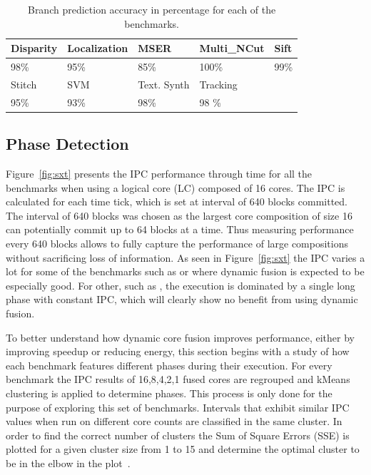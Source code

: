 \begin{table}[t]
  \small
  \centering
 \begin{tabular} { | l | l | l | l | l | }
 \hline
   \cellcolor[gray]{0.7}Disparity & \cellcolor[gray]{0.7} Localization& \cellcolor[gray]{0.7} MSER& \cellcolor[gray]{0.7} Multi\_NCut& \cellcolor[gray]{0.7} Sift\\ \hline
	98\%  & 95\% & 85\%  & 100\%& 99\%\\ \hline
	 \cellcolor[gray]{0.7} Stitch & \cellcolor[gray]{0.7} SVM & \cellcolor[gray]{0.7} Text. Synth & \cellcolor[gray]{0.7} Tracking&\\ \hline
	  95\%& 93\%& 98\%& 98 \%&\\ \hline
	\end{tabular}
  \caption{Branch prediction accuracy in percentage for each of the benchmarks.}\label{tab:sd-vbsbpred}
\end{table}

\subsection{Phase Detection}
Figure~\ref{fig:sxt} presents the IPC performance through time for all the benchmarks when using a logical core (LC) composed of 16 cores.
The IPC is calculated for each time tick, which is set at interval of 640 blocks committed.
The interval of 640 blocks was chosen as the largest core composition of size 16 can potentially commit up to 64 blocks at a time.
Thus measuring performance every 640 blocks allows to fully capture the performance of large compositions without sacrificing loss of information.
As seen in Figure~\ref{fig:sxt} the IPC varies a lot for some of the benchmarks such as  or  where dynamic fusion is expected to be especially good.
For other, such as , the execution is dominated by a single long phase with constant IPC, which will clearly show no benefit from using dynamic fusion.

To better understand how dynamic core fusion improves performance, either by improving speedup or reducing energy, this section begins with a study of how each benchmark features different phases during their execution.
For every benchmark the IPC results of 16,8,4,2,1 fused cores are regrouped and kMeans clustering is applied to determine phases.
This process is only done for the purpose of exploring this set of benchmarks.
Intervals that exhibit similar IPC values when run on different core counts are classified in the same cluster.
In order to find the correct number of clusters the Sum of Square Errors (SSE) is plotted for a given cluster size from 1 to 15 and determine the optimal cluster to be in the elbow in the plot~\cite{everitCluster2001}.

